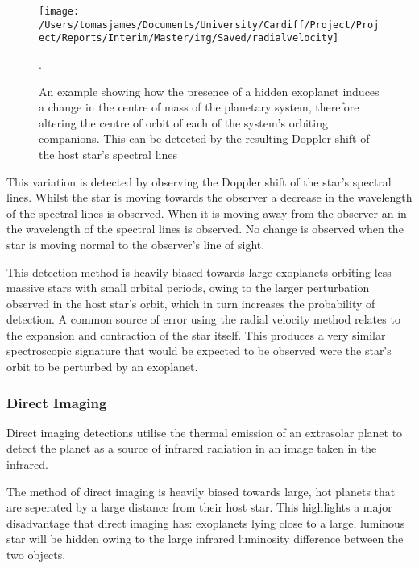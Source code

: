 \documentclass[twoside]{article}
\begin{document}
\begin{multicols}{2}
\begin{figure}[H]
\centering
    \texttt{[image: /Users/tomasjames/Documents/University/Cardiff/Project/Project/Reports/Interim/Master/img/Saved/radialvelocity]}
\caption[An example showing how the presence of a hidden exoplanet induces a change in the centre of mass of the planetary system, therefore altering the centre of orbit of each of the system's orbiting companions. This can be detected by the resulting Doppler shift of the host star's spectral lines.] {An example showing how the presence of a hidden exoplanet induces a change in the centre of mass of the planetary system, therefore altering the centre of orbit of each of the system's orbiting companions. This can be detected by the resulting Doppler shift of the host star's spectral lines \citep{rvdetect}}.\label{rvdetect}
\end{figure}

This variation is detected by observing the Doppler shift of the star’s spectral lines. Whilst the star is moving towards the observer a decrease in the wavelength of the spectral lines is observed. When it is moving away from the observer an in the wavelength of the spectral lines is observed. No change is observed when the star is moving normal to the observer’s line of sight. 

This detection method is heavily biased towards large exoplanets orbiting less massive stars with small orbital periods, owing to the larger perturbation observed in the host star’s orbit, which in turn increases the probability of detection. A common source of error using the radial velocity method relates to the expansion and contraction of the star itself. This produces a very similar spectroscopic signature that would be expected to be observed were the star's orbit to be perturbed by an exoplanet.

\subsubsection{Direct Imaging }
Direct imaging detections utilise the thermal emission of an extrasolar planet to detect the planet as a source of infrared radiation in an image taken in the infrared. 

The method of direct imaging is heavily biased towards large, hot planets that are seperated by a large distance from their host star. This highlights a major disadvantage that direct imaging has: exoplanets lying close to a large, luminous star will be hidden owing to the large infrared luminosity difference between the two objects.   


\end{multicols}
\end{document}
